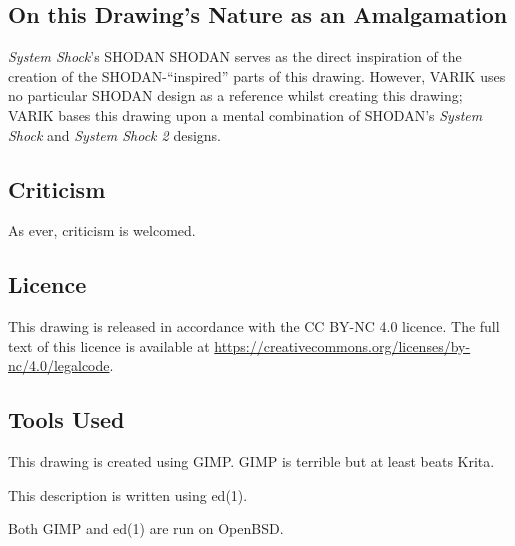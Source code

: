 \documentclass{report}
\begin{document}
\subsection{On this Drawing's Nature as an Amalgamation}
\textit{System Shock}'s SHODAN SHODAN serves as the direct inspiration of the creation of the SHODAN-``inspired'' parts of this drawing.  However, VARIK uses no particular SHODAN design as a reference whilst creating this drawing; VARIK bases this drawing upon a mental combination of SHODAN's \textit{System Shock} and \textit{System Shock 2} designs.
\subsection{Criticism}
As ever, criticism is welcomed.
\subsection{Licence}
This drawing is released in accordance with the CC BY-NC 4.0 licence.  The full text of this licence is available at \url{https://creativecommons.org/licenses/by-nc/4.0/legalcode}.
\subsection{Tools Used}
This drawing is created using GIMP.  GIMP is terrible but at least beats Krita.

This description is written using ed(1).

Both GIMP and ed(1) are run on OpenBSD.
\end{document}

